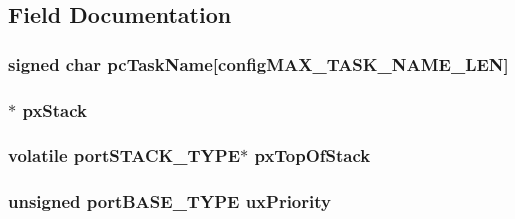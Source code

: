 \subsection{Field Documentation}
\hypertarget{structtsk_task_control_block_ae2168a3ab594256a9496078ec2ba9d47}{
\subsubsection[{pc\-Task\-Name}]{\setlength{\rightskip}{0pt plus 5cm}signed char pc\-Task\-Name\mbox{[}{\bf config\-M\-A\-X\-\_\-\-T\-A\-S\-K\-\_\-\-N\-A\-M\-E\-\_\-\-L\-E\-N}\mbox{]}}}\label{structtsk_task_control_block_ae2168a3ab594256a9496078ec2ba9d47}
\hypertarget{structtsk_task_control_block_ab6f86bf9da6d5df87a4272383cc7e4f4}{
\subsubsection[{px\-Stack}]{$\ast$ px\-Stack}}\label{structtsk_task_control_block_ab6f86bf9da6d5df87a4272383cc7e4f4}
\hypertarget{structtsk_task_control_block_a2f21c253445a66961c936f8e79783cff}{
\subsubsection[{px\-Top\-Of\-Stack}]{\setlength{\rightskip}{0pt plus 5cm}volatile {\bf port\-S\-T\-A\-C\-K\-\_\-\-T\-Y\-P\-E}$\ast$ px\-Top\-Of\-Stack}}\label{structtsk_task_control_block_a2f21c253445a66961c936f8e79783cff}
\hypertarget{structtsk_task_control_block_af9efa11aaf2bd2b1e7b0da3991a493c8}{
\subsubsection[{ux\-Priority}]{\setlength{\rightskip}{0pt plus 5cm}unsigned {\bf port\-B\-A\-S\-E\-\_\-\-T\-Y\-P\-E} ux\-Priority}}\label{structtsk_task_control_block_af9efa11aaf2bd2b1e7b0da3991a493c8}

